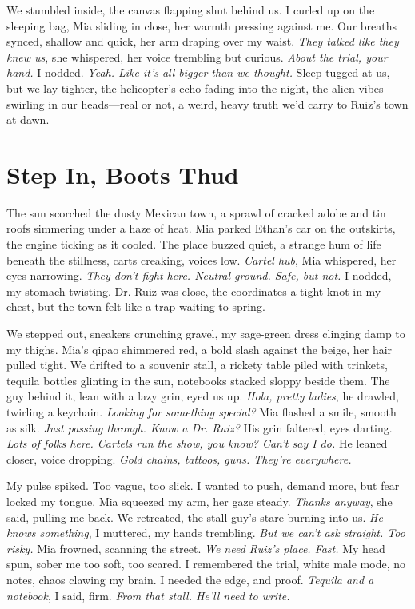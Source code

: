 \documentclass[12pt,oneside]{book}
\begin{document}
We stumbled inside, the canvas flapping shut behind us. I curled up on the sleeping bag, Mia sliding in close, her warmth pressing against me. Our breaths synced, shallow and quick, her arm draping over my waist. \textit{They talked like they knew us}, she whispered, her voice trembling but curious. \textit{About the trial, your hand.} I nodded. \textit{Yeah. Like it’s all bigger than we thought.} Sleep tugged at us, but we lay tighter, the helicopter’s echo fading into the night, the alien vibes swirling in our heads—real or not, a weird, heavy truth we’d carry to Ruiz’s town at dawn.

\chapter{Step In, Boots Thud}

The sun scorched the dusty Mexican town, a sprawl of cracked adobe and tin roofs simmering under a haze of heat. Mia parked Ethan’s car on the outskirts, the engine ticking as it cooled. The place buzzed quiet, a strange hum of life beneath the stillness, carts creaking, voices low. \textit{Cartel hub}, Mia whispered, her eyes narrowing. \textit{They don’t fight here. Neutral ground. Safe, but not.} I nodded, my stomach twisting. Dr. Ruiz was close, the coordinates a tight knot in my chest, but the town felt like a trap waiting to spring.

We stepped out, sneakers crunching gravel, my sage-green dress clinging damp to my thighs. Mia’s qipao shimmered red, a bold slash against the beige, her hair pulled tight. We drifted to a souvenir stall, a rickety table piled with trinkets, tequila bottles glinting in the sun, notebooks stacked sloppy beside them. The guy behind it, lean with a lazy grin, eyed us up. \textit{Hola, pretty ladies}, he drawled, twirling a keychain. \textit{Looking for something special?} Mia flashed a smile, smooth as silk. \textit{Just passing through. Know a Dr. Ruiz?} His grin faltered, eyes darting. \textit{Lots of folks here. Cartels run the show, you know? Can’t say I do.} He leaned closer, voice dropping. \textit{Gold chains, tattoos, guns. They’re everywhere.}

My pulse spiked. Too vague, too slick. I wanted to push, demand more, but fear locked my tongue. Mia squeezed my arm, her gaze steady. \textit{Thanks anyway}, she said, pulling me back. We retreated, the stall guy’s stare burning into us. \textit{He knows something}, I muttered, my hands trembling. \textit{But we can’t ask straight. Too risky.} Mia frowned, scanning the street. \textit{We need Ruiz’s place. Fast.} My head spun, sober me too soft, too scared. I remembered the trial, white male mode, no notes, chaos clawing my brain. I needed the edge, and proof. \textit{Tequila and a notebook}, I said, firm. \textit{From that stall. He’ll need to write.}
\end{document}
